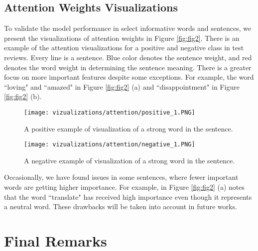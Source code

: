 \documentclass[runningheads]{llncs}
\begin{document}
\subsection{Attention Weights Visualizations}

To validate the model performance in select informative words and sentences, we present the visualizations of attention weights in Figure \ref{fig:fig2}. There is an example of the attention visualizations for a positive and negative class in test reviews. Every line is a sentence. Blue color denotes the sentence weight, and red denotes the word weight in determining the sentence meaning. There is a greater focus on more important features despite some exceptions. For example, the word ``loving" and ``amazed" in Figure \ref{fig:fig2} (a) and ``disappointment" in Figure \ref{fig:fig2} (b).

\begin{figure*}[!ht]
  \center
  \begin{subfigure}{\linewidth}
    \center
      \texttt{[image: vizualizations/attention/positive\_1.PNG]}
      \caption{A positive example of visualization of a strong word in the sentence.}  
  \end{subfigure}\par\medskip
  
  \begin{subfigure}{\linewidth}
   \center
   \texttt{[image: vizualizations/attention/negative\_1.PNG]}
   \caption{A negative example of visualization of a strong word in the sentence.}
  \end{subfigure}\par\medskip
\vspace{-2mm}
  \caption{Visualization of attention weights computed by the proposed model}
  \label{fig:fig2}
\end{figure*}

\vspace{-4mm}

Occasionally, we have found issues in some sentences, where fewer important words are getting higher importance. For example, in Figure \ref{fig:fig2} (a) notes that the word ``translate" has received high importance even though it represents a neutral word. These drawbacks will be taken into account in future works.\\[-7mm]

\section{Final Remarks}
\end{document}
